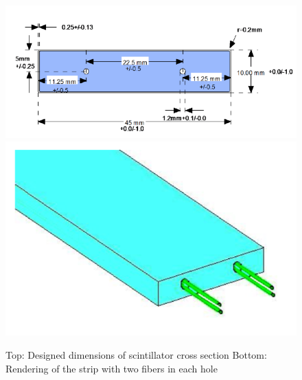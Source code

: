 \begin{figure}[hbt]
\centering
\includegraphics[width=1.05\columnwidth,keepaspectratio]{img/S3_4a.png}
\includegraphics[width=0.75\columnwidth,keepaspectratio]{img/S3_4b.png}
\caption[PCAL UVW Layers]{Top: Designed dimensions of scintillator cross section Bottom: Rendering of the strip with two fibers in each hole}
\label{fig:S3_4}
\end{figure}

